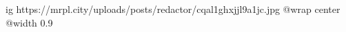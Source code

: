  
 
 
 
 

\ifcmt
  ig https://mrpl.city/uploads/posts/redactor/cqal1ghxjjl9a1jc.jpg
  @wrap center
  @width 0.9
\fi
